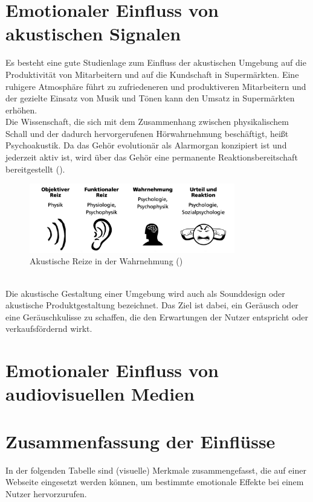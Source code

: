 \documentclass[./dokumentation.tex]{subfiles}
\begin{document}
\section{Emotionaler Einfluss von akustischen Signalen}
Es besteht eine gute Studienlage zum Einfluss der akustischen Umgebung auf die Produktivität von Mitarbeitern und auf die Kundschaft in Supermärkten. Eine ruhigere Atmosphäre führt zu zufriedeneren und produktiveren Mitarbeitern und der gezielte Einsatz von Musik und Tönen kann den Umsatz in Supermärkten erhöhen. \\
Die Wissenschaft, die sich mit dem Zusammenhang zwischen physikalischem Schall und der dadurch hervorgerufenen Hörwahrnehmung beschäftigt, heißt Psychoakustik. Da das Gehör evolutionär als Alarmorgan konzipiert ist und jederzeit aktiv ist, wird über das Gehör eine permanente Reaktionsbereitschaft bereitgestellt (\cite{fraunhofer}).\\

\begin{figure}[H]
    \centering
    \includegraphics[width=0.8\textwidth]{bilder/fraunhofer_akustik.png}
    \caption{Akustische Reize in der Wahrnehmung (\cite{fraunhofer})}
    \label{fig10:fraunhofer}
\end{figure}\\

Die akustische Gestaltung einer Umgebung wird auch als Sounddesign oder akustische Produktgestaltung bezeichnet. Das Ziel ist dabei, ein Geräusch oder eine Geräuschkulisse zu schaffen, die den Erwartungen der Nutzer entspricht oder verkaufsfördernd wirkt. \\

\section{Emotionaler Einfluss von audiovisuellen Medien} %

\section{Zusammenfassung der Einflüsse} %
In der folgenden Tabelle sind (visuelle) Merkmale zusammengefasst, die auf einer Webseite eingesetzt werden können, um bestimmte emotionale Effekte bei einem Nutzer hervorzurufen. \\
\end{document}
